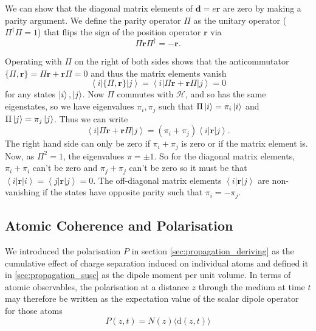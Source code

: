     We can show that the diagonal matrix elements of $\mathbf{d} = e\mathbf{r}$
    are zero by making a parity argument. We define the parity operator $\Pi$ as
    the unitary operator (\ie $\Pi^\dagger\Pi = 1$) that flips the sign of the
    position operator $\mathbf{r}$ via
    \begin{equation}
      \Pi \mathbf{r} \Pi^\dagger = -\mathbf{r}.
    \end{equation}

    Operating with $\Pi$ on the right of both sides shows that the anticommutator
    $\{ \Pi, \mathbf{r} \} = \Pi \mathbf{r} + \mathbf{r} \Pi = 0$ and thus the
    matrix elements vanish
    \begin{equation}
      \left< i \right| \{ \Pi, \mathbf{r} \} \left| j \right> = 
      \left< i \right| \Pi \mathbf{r} + \mathbf{r} \Pi \left| j \right> = 0 
    \end{equation}
    for any states $\Ket{i}, \Ket{j}$. Now $\Pi$ commutes with $\mathcal{H}$,
    and so has the same eigenstates, so we have eigenvalues $\pi_i, \pi_j$ such
    that $\Pi \Ket{i} = \pi_i \Ket{i}$ and $\Pi \Ket{j} = \pi_j \Ket{j}$. Thus
    we can write
    \begin{equation}
      \left< i \right| \Pi \mathbf{r} + \mathbf{r} \Pi \left| j \right> = 
      (\pi_i + \pi_j) \left< i \right|  \mathbf{r} \left| j \right>.
    \end{equation}
    The right hand side can only be zero if $\pi_i + \pi_j$ is zero or if the
    matrix element is. Now, as $\Pi^2 = 1$, the eigenvalues $\pi = \pm1$. So for
    the diagonal matrix elements, $\pi_i + \pi_i$ can't be zero and $\pi_j +
    \pi_j$ can't be zero so it must be that $\left< i \right|\mathbf{r} \left| i
    \right> = \left< j \right|\mathbf{r} \left| j \right> = 0$. The off-diagonal
    matrix elements $\left< i \right|\mathbf{r} \left| j \right>$ are  non-
    vanishing if the states have opposite parity such that $\pi_i = -\pi_j$.

  \subsection{Atomic Coherence and Polarisation}

    We introduced the polarisation $P$ in section \ref{sec:propagation_deriving}
    as the cumulative effect of charge separation induced on individual atoms
    and defined it in \ref{sec:propagation_susc} as the dipole moment per unit
    volume.  In terms of atomic observables, the polarisation at a distance $z$
    through the medium at time $t$ may therefore be written as the expectation
    value of the scalar dipole operator for those atoms
    \begin{equation}
      P(z,t) = N(z) \langle \mathrm{d}(z,t) \rangle
    \end{equation}

